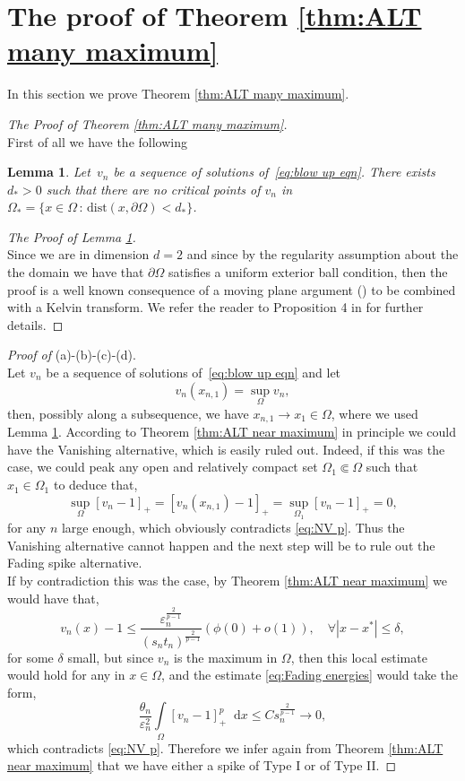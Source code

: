 \documentclass[10pt]{amsart}
\newcommand{\dd}{\mathop{}\!\mathrm{d}}
\newcommand{\eps}{\varepsilon}
\renewcommand{\to}{\rightarrow}
\newcommand{\pa}{\partial}
\newcommand{\dt}{\delta}
\newcommand{\om}{\Omega}
\newtheorem{lemma}[theorem]{Lemma}
\begin{document}
\section{The proof of Theorem \ref{thm:ALT many maximum}}\label{sec6}
In this section we prove Theorem \ref{thm:ALT many maximum}.
\begin{proof}[The Proof of Theorem \ref{thm:ALT many maximum}]$\,$\\
First of all we have the following
\begin{lemma}\label{lem:bdy} Let~$v_n$ be a sequence of solutions of~\eqref{eq:blow up eqn}. There exists $d_*>0$ such that there are no critical points of $v_n$ in
$\om_{*}=\{x\in\om\,:\,\mbox{dist}(x,\pa \om)<d_*\}$.
\end{lemma}
\begin{proof}[The Proof of Lemma \ref{lem:bdy}]$\,$\\ Since we are in dimension $d=2$ and since by the regularity assumption about the
the domain we have that $\pa \Omega$ satisfies a uniform exterior ball condition, then the proof is a well known consequence of a
moving plane argument (\cite{gnn}) to be combined with a Kelvin transform. We refer the reader to Proposition 4 in \cite{MaW} for further details.
\end{proof}

\medskip
{\it Proof of} (a)-(b)-(c)-(d).\\
Let $v_n$ be a sequence of solutions of~\eqref{eq:blow up eqn} and let
$$
v_n(x_{n,1})=\sup\limits_{\Omega}{v_n},
$$
then, possibly along a subsequence, we have $x_{n,1}\to x_1\in\om$, where we used Lemma \ref{lem:bdy}. According to Theorem \ref{thm:ALT near maximum} in principle
we could have the Vanishing alternative, which is easily ruled out. Indeed, if this was the case, we could peak any open and relatively
compact set $\om_1\Subset \om$ such that $x_1\in \om_1$ to deduce that,
$$
\sup\limits_{\om}[v_n-1]_+=[v_n(x_{n,1})-1]_+=\sup\limits_{\om_1}[v_n-1]_+=0,
$$
for any $n$ large enough, which obviously contradicts \eqref{eq:NV p}. Thus the Vanishing alternative cannot happen and the next step will be to rule out the Fading spike alternative.\\
If by contradiction this was the case, by Theorem \ref{thm:ALT near maximum} we would have that,
$$
v_n(x)- 1\leq  \frac{\eps_n^{\frac{2}{p-1}}}{(s_n t_n)^{\frac{2}{p-1}}}(\phi(0)+o(1)), \quad \forall |x-x^*|\leq \dt,
$$
for some $\dt$ small, but since $v_n$ is the maximum in $\om$, then this local estimate would hold for any in $x\in \om$, and the estimate
\eqref{eq:Fading energies} would take the form,
$$
\frac{\theta_n}{\eps_n^2}\int\limits_{\om} [v_n-1]_+^{p}\dd{x}\leq C s_n^{\frac{2}{p-1}}\to 0,
$$
which contradicts \eqref{eq:NV p}. Therefore we infer again from Theorem \ref{thm:ALT near maximum} that we have either
a spike of Type I or of Type II.


\end{proof}
\end{document}
